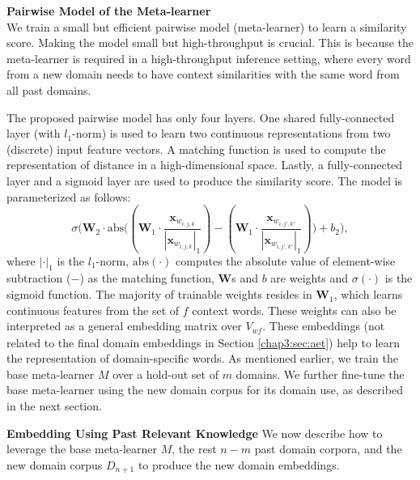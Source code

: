 \textbf{Pairwise Model of the Meta-learner}\\
We train a small but efficient pairwise model (meta-learner) to learn a similarity score. 
Making the model small but high-throughput is crucial.
This is because the meta-learner is required in a high-throughput inference setting, where every word from a new domain needs to have context similarities with the same word from all past domains. 

The proposed pairwise model has only four layers. 
One shared fully-connected layer (with $l_1$-norm) is used to learn two continuous representations from two (discrete) input feature vectors.
A matching function is used to compute the representation of distance in a high-dimensional space.
Lastly, a fully-connected layer and a sigmoid layer are used to produce the similarity score.
The model is parameterized as follows:
\begin{equation}
\sigma \big( \bm{W}_2 \cdot \text{abs}\big( ( \bm{W}_1 \cdot \frac{\mathbf{x}_{w_{i, j, k}}}{ |\mathbf{x}_{w_{i, j, k}}|_1 }) - (\bm{W}_1 \cdot \frac{\mathbf{x}_{w_{i, j', k'}} }{ |\mathbf{x}_{w_{i, j', k'}}|_1 } ) \big) + b_2 \big) ,
\end{equation}
where $|\cdot|_1$ is the $l_1$-norm, $\text{abs}(\cdot)$ computes the absolute value of element-wise subtraction ($-$) as the matching function, $\bm{W}$s and $b$ are weights and $\sigma (\cdot)$ is the sigmoid function.
The majority of trainable weights resides in $\bm{W}_1$, which learns continuous features from the set of $f$ context words.
These weights can also be interpreted as a general embedding matrix over $V_{\textit{wf}}$. 
These embeddings (not related to the final domain embeddings in Section \ref{chap3:sec:aet}) help to learn the representation of domain-specific words.
As mentioned earlier, we train the base meta-learner $M$ over a hold-out set of $m$ domains.
We further fine-tune the base meta-learner using the new domain corpus for its domain use, as described in the next section.

\textbf{Embedding Using Past Relevant Knowledge}
We now describe how to leverage the base meta-learner $M$, the rest $n-m$ past domain corpora, and the new domain corpus $D_{n+1}$ to produce the new domain embeddings.

